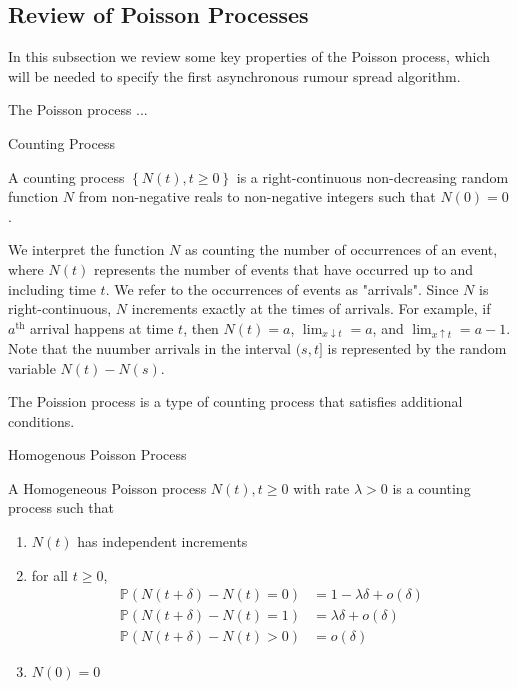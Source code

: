 \subsection{Review of Poisson Processes}

In this subsection we review some key properties of the Poisson process, which will be needed to specify the first asynchronous rumour spread algorithm.

The Poisson process ...
\begin{definition}
	Counting Process

	\noindent
	A counting process $\left\{ N(t), t \geq 0 \right\}$ is a right-continuous non-decreasing random function $N$ from non-negative reals to non-negative integers such that $N(0) = 0$.
\end{definition}

We interpret the function $N$ as counting the number of occurrences of an event, where $N(t)$ represents the number of events that have occurred up to and including time $t$. We refer to the occurrences of events as "arrivals".  Since $N$ is right-continuous, $N$ increments exactly at the times of arrivals. For example, if $a^\text{th}$ arrival happens at time $t$, then $N(t) = a$, $\lim_{x \downarrow t} = a$, and $\lim_{x \uparrow t} = a - 1$. Note that the nuumber arrivals in the interval $(s, t]$ is represented by the random variable $N(t) - N(s)$. 

The Poission process is a type of counting process that satisfies additional conditions. 

\begin{definition}
	Homogenous Poisson Process

	\noindent
	A Homogeneous Poisson process ${N(t), t \geq 0}$ with rate $\lambda > 0$ is a counting process such that
	\begin{enumerate}
		\item $N(t)$ has independent increments
		\item for all $t \geq 0$, 
		\begin{align*}
			\mathbb{P}(N(t + \delta) - N(t) = 0) &= 1 - \lambda\delta + o(\delta) \\
			\mathbb{P}(N(t + \delta) - N(t) = 1) &= \lambda\delta + o(\delta) \\
			\mathbb{P}(N(t + \delta) - N(t) > 0) &= o(\delta)
		\end{align*}
		\item $N(0) = 0$
	\end{enumerate}
\end{definition}

